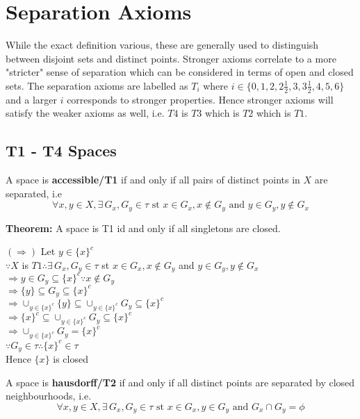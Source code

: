 \documentclass{article}
\begin{document}
\section{Separation Axioms}

While the exact definition various, these are generally used to distinguish between disjoint sets and distinct points. Stronger axioms correlate to a more "stricter" sense of separation which can be considered in terms of open and closed sets. The separation axioms are labelled as $T_i$ where $i \in \{0,1,2, 2\frac{1}{2}, 3, 3\frac{1}{2},4,5,6\}$ and a larger $i$ corresponds to stronger properties. Hence stronger axioms will satisfy the weaker axioms as well, i.e. $T4$ is $T3$ which is $T2$ which is $T1$.

 \subsection{T1 - T4 Spaces}

A space is \textbf{accessible/T1} if and only if all pairs of distinct points in $X$ are separated, i.e 
$$\forall x,y \in X, \exists \, G_x,G_y \in \tau \text{ st } x \in G_x, x \not\in G_y \text{ and } y \in G_y, y \not\in G_x$$

\textbf{Theorem:} A space is T1 id and only if all singletons are closed.
\begin{tcolorbox}[colback=lightgray!10,colframe=lightgray!10, fontupper=\linespread{1.5}\selectfont]
	$(\Rightarrow)$ Let $y \in \{x\}^c$ \\
	$\because X$ is $T1 \therefore \exists \, G_x, G_y \in \tau$ st $x \in G_x, x \not\in G_y$ and $y \in G_y, y \not\in G_x$ \\
	$\Rightarrow y \in G_y \subseteq \{x\}^c \because x \not\in G_y$ \\
	$\Rightarrow \{y\} \subseteq G_y \subseteq \{x\}^c$ \\
	$\Rightarrow \cup_{y \in \{x\}^c} \{y\} \subseteq \cup_{y \in \{x\}^c} G_y \subseteq \{x\}^c$ \\
	$\Rightarrow \{x\}^c \subseteq \cup_{y \in \{x\}^c} G_y \subseteq \{x\}^c$ \\
	$\Rightarrow \cup_{y \in \{x\}^c} G_y = \{x\}^c$ \\
	$\because G_y \in \tau \therefore \{x\}^c \in \tau$ \\
	Hence $\{x\}$ is closed	
\end{tcolorbox}

A space is \textbf{hausdorff/T2} if and only if all distinct points are separated by closed neighbourhoods, i.e. 
$$\forall x,y \in X, \exists \, G_x, G_y \in \tau \text{ st } x \in G_x, y \in G_y \text{ and } G_x \cap G_y = \phi$$
\end{document}
